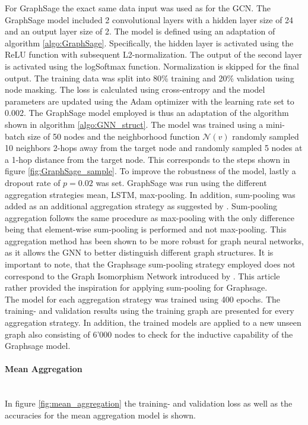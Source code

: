   For GraphSage the exact same data input was used as for the GCN. The 
  GraphSage model included 2 convolutional layers with a hidden layer size of
  24 and an output layer size of 2. The model is defined using an adaptation of 
  algorithm \ref{algo:GraphSage}. Specifically, the hidden layer is activated 
  using the ReLU function with subsequent L2-normalization. The output of the 
  second layer is activated using the logSoftmax function. Normalization is 
  skipped for the final output. The training data was split into 80\% training 
  and 20\% validation using node masking. The loss is calculated using 
  cross-entropy and the model parameters are updated using the Adam optimizer 
  with the learning rate set to 0.002. The GraphSage model employed is thus an
  adaptation of the algorithm shown in algorithm \ref{algo:GNN_struct}. The 
  model was trained using a mini-batch size of 50 nodes and the neighborhood 
  function $\mathcal{N}(v)$ randomly sampled 10 neighbors 2-hops away from the 
  target node and randomly sampled 5 nodes at a 1-hop distance from the target 
  node. This corresponds to the steps shown in figure \ref{fig:GraphSage_sample}. 
  To improve the robustness of the model, lastly a dropout rate of $p = 0.02$ 
  was set. GraphSage was run using the different aggregation strategies mean, 
  LSTM, max-pooling. In addition, sum-pooling was added as an additional 
  aggregation strategy as suggested by \cite{xu2018powerful}. Sum-pooling 
  aggregation follows the same procedure as max-pooling with the only difference 
  being that element-wise sum-pooling is performed and not max-pooling. This 
  aggregation method has been shown to be more robust for graph neural networks, 
  as it allows the GNN to better distinguish different graph structures. It is
  important to note, that the Graphsage sum-pooling strategy employed does not
  correspond to the Graph Isomorphism Network introduced by 
  \cite{xu2018powerful}. This article rather provided the inspiration for
  applying sum-pooling for Graphsage. \\
  
  \noindent The model for each aggregation strategy was trained using 400 epochs. 
  The training- and validation results using the training graph are presented 
  for every aggregation strategy. In addition, the trained models are applied 
  to a new unseen graph also consisting of 6'000 nodes to check for the 
  inductive capability of the Graphsage model. 

  \paragraph{Mean Aggregation}  \mbox{}\\ 
  In figure \ref{fig:mean_aggregation} the training- and validation loss as
  well as the accuracies for the mean aggregation model is shown.

